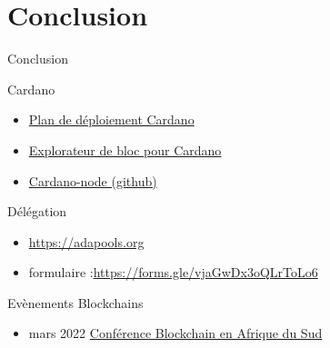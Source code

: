 \documentclass{beamer}
\begin{document}
\section{Conclusion}
\label{sec:orgbd8c608}
\begin{frame}[label={sec:orgccfd267}]{Conclusion}
  \begin{block}{Cardano}
    \begin{itemize}
    \item \href{https://roadmap.cardano.org/en/}{Plan de déploiement Cardano}
    \item \href{https://explorer.cardano.org/}{Explorateur de bloc pour Cardano}
    \item \href{//github.com/input-output-hk/cardano-node}{Cardano-node (github)}
    \end{itemize}
    \begin{block}{Délégation}
      \begin{itemize}
      \item \url{https://adapools.org}
      \item formulaire :\url{https://forms.gle/vjaGwDx3oQLrToLo6}
      \end{itemize}
    \end{block}
  \end{block}

  \begin{block}{Evènements Blockchains}
    \begin{itemize}
    \item mars 2022 \href{https://blockchainafrica.co/blockchain-africa-conference-johannesburg-2/}{Conférence Blockchain en Afrique du Sud}
    \end{itemize}
  \end{block}
\end{frame}
\end{document}
